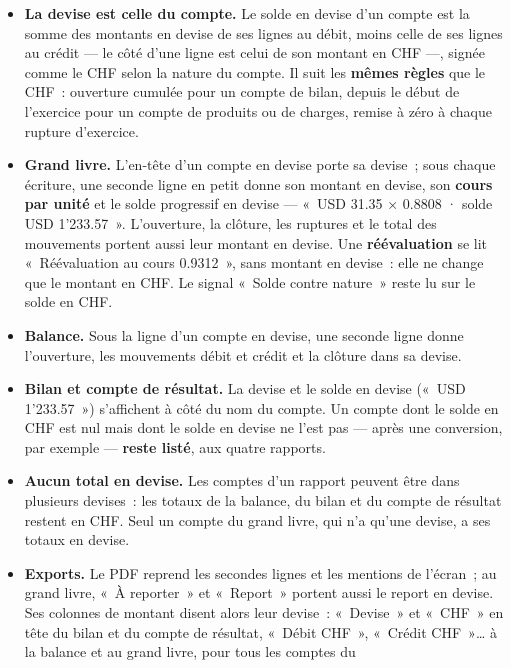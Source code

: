 \documentclass[a4paper,11pt,oneside]{article}
\begin{document}
\begin{itemize}
    \item \textbf{La devise est celle du compte.} Le solde en devise d'un compte est la somme des
          montants en devise de ses lignes au débit, moins celle de ses lignes au crédit --- le côté
          d'une ligne est celui de son montant en CHF ---, signée comme le CHF selon la nature du
          compte. Il suit les \textbf{mêmes règles} que le CHF~: ouverture cumulée pour un compte de
          bilan, depuis le début de l'exercice pour un compte de produits ou de charges, remise à
          zéro à chaque rupture d'exercice.
    \item \textbf{Grand livre.} L'en-tête d'un compte en devise porte sa devise~; sous chaque
          écriture, une seconde ligne en petit donne son montant en devise, son \textbf{cours par
          unité} et le solde progressif en devise --- «~USD 31.35 × 0.8808 · solde USD 1'233.57~».
          L'ouverture, la clôture, les ruptures et le total des mouvements portent aussi leur montant
          en devise. Une \textbf{réévaluation} se lit «~Réévaluation au cours 0.9312~», sans montant
          en devise~: elle ne change que le montant en CHF. Le signal «~Solde contre nature~» reste
          lu sur le solde en CHF.
    \item \textbf{Balance.} Sous la ligne d'un compte en devise, une seconde ligne donne
          l'ouverture, les mouvements débit et crédit et la clôture dans sa devise.
    \item \textbf{Bilan et compte de résultat.} La devise et le solde en devise («~USD 1'233.57~»)
          s'affichent à côté du nom du compte. Un compte dont le solde en CHF est nul mais dont le
          solde en devise ne l'est pas --- après une conversion, par exemple --- \textbf{reste
          listé}, aux quatre rapports.
    \item \textbf{Aucun total en devise.} Les comptes d'un rapport peuvent être dans plusieurs
          devises~: les totaux de la balance, du bilan et du compte de résultat restent en CHF. Seul
          un compte du grand livre, qui n'a qu'une devise, a ses totaux en devise.
    \item \textbf{Exports.} Le PDF reprend les secondes lignes et les mentions de l'écran~; au grand
          livre, «~À reporter~» et «~Report~» portent aussi le report en devise. Ses colonnes de montant
          disent alors leur devise~: «~Devise~» et «~CHF~» en tête du bilan et du compte de résultat,
          «~Débit CHF~», «~Crédit CHF~»\ldots{} à la balance et au grand livre, pour tous les comptes du

\end{itemize}
\end{document}
